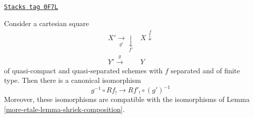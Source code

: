 \begin{lemma}
\label{more-etale-lemma-base-change-shriek}
\href{https://stacks.math.columbia.edu/tag/0F7L}{\texttt{Stacks tag 0F7L}}

Consider a cartesian square
$$
\begin{array}{cc}X' \underset{g'}{\longrightarrow}\underset{f'}{\downarrow} & X \overset{f}{\downarrow} \\ Y' \overset{g}{\longrightarrow} & Y\end{array}
$$
of quasi-compact and quasi-separated schemes with $f$ separated and
of finite type. Then there is a canonical isomorphism
$$
g^{-1} \circ Rf_! \to Rf'_! \circ (g')^{-1}
$$
Moreover, these isomorphisms are compatible with the isomorphisms
of Lemma \ref{more-etale-lemma-shriek-composition}.
\end{lemma}

